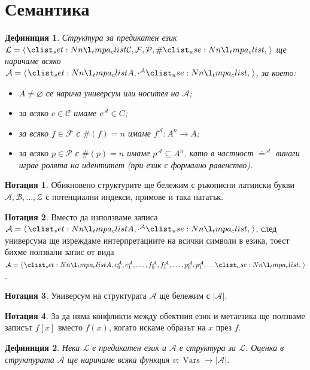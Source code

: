 \documentclass[12pt]{article}
\newcommand{\vars}{\operatorname{Vars}}
\newcommand{\calA}{\mathcal{A}}
\newcommand{\calL}{\mathcal{L}}
\newcommand{\calZ}{\mathcal{Z}}
\newcommand{\calF}{\mathcal{F}}
\newcommand{\calP}{\mathcal{P}}
\newcommand{\calC}{\mathcal{C}}
\newcommand{\calB}{\mathcal{B}}
\newtheorem*{definition}{Дефиниция}
\theoremstyle{definition}
\newtheorem*{notation}{Нотация}
\begin{document}
\newpage

\section{Семантика}

\begin{definition}
	Структура за предикатен език $\calL = \opair{\calC, \calF, \calP, \#}$ ще наричаме всяко $\calA = \opair{A, \cdot^\calA}$, за което:
	\begin{itemize}
		\item $A \neq \varnothing$ се нарича универсум или носител на $\calA$;
		\item за всяко $c \in \calC$ имаме $c^\calA \in C$;
		\item за всяко $f \in \calF$ с $\#(f) = n$ имаме $f^\calA : A^n \rightarrow A$;
		\item за всяко $p \in \calP$ с $\#(p) = n$ имаме $p^\calA \subseteq A^n$, като в частност $\doteq^\calA$ винаги играе ролята на идентитет (при език с формално равенство).
	\end{itemize}
\end{definition}

\begin{notation}
	Обикновено структурите ще бележим с ръкописни латински букви $\calA, \calB, \dots, \calZ$ с потенциални индекси, примове и така нататък.
\end{notation}

\begin{notation}
	Вместо да използваме записа $\calA = \opair{A, \cdot^\calA}$, след универсума ще изреждаме интерпретациите на всички символи в езика, тоест бихме ползвали запис от вида $\calA = \opair{A, c_0^\calA, c_1^\calA, \dots, f_0^\calA, f_1^\calA, \dots, p_0^\calA, p_1^\calA, \dots}$.
\end{notation}

\begin{notation}
	Универсум на структурата $\calA$ ще бележим с $|\calA|$.
\end{notation}

\begin{notation}
	За да няма конфликти между обектния език и метаезика ще ползваме записът $f[x]$ вместо $f(x)$, когато искаме образът на $x$ през $f$.
\end{notation}

\begin{definition}
	Нека $\calL$ е предикатен език и $\calA$ е структура за $\calL$.
	Оценка в структурата $\calA$ ще наричаме всяка функция $v : \vars \rightarrow |\calA|$.
\end{definition}
\end{document}
